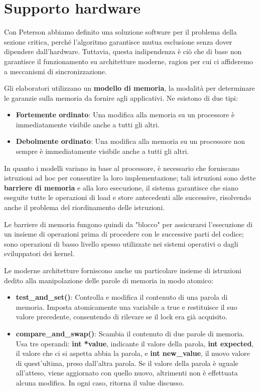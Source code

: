 \section{Supporto hardware}
Con Peterson abbiamo definito una soluzione software per il problema della sezione critica, perché l'algoritmo garantisce mutua esclusione senza dover
dipendere dall'hardware. Tuttavia, questa indipendenza è ciò che di base non garantisce il funzionamento su architetture moderne, ragion per cui ci
affideremo a meccanismi di sincronizzazione.\par
Gli elaboratori utilizzano un \textbf{modello di memoria}, la modalità per determinare le garanzie sulla memoria da fornire agli applicativi. Ne
esistono di due tipi: \begin{itemize}
    \item \textbf{Fortemente ordinato}: Una modifica alla memoria su un processore è immediatamente visibile anche a tutti gli altri.
    \item \textbf{Debolmente ordinato}: Una modifica alla memoria su un processore non sempre è immediatamente visibile anche a tutti gli altri.
\end{itemize}

\noindent In quanto i modelli variano in base al processore, è necessario che forniscano istruzioni ad hoc per consentire la loro implementazione; tali
istruzioni sono dette \textbf{barriere di memoria} e alla loro esecuzione, il sistema garantisce che siano eseguite tutte le operazioni di load e
store antecedenti alle successive, risolvendo anche il problema del riordinamento delle istruzioni.\par
Le barriere di memoria fungono quindi da "blocco" per assicurarsi l'esecuzione di un insieme di operazioni prima di procedere con le successive parti
del codice; sono operazioni di basso livello spesso utilizzate nei sistemi operativi o dagli sviluppatori dei kernel.\par
Le moderne architetture forniscono anche un particolare insieme di istruzioni dedito alla manipolazione delle parole di memoria in modo
atomico: \begin{itemize}
    \item \textbf{test\_and\_set()}: Controlla e modifica il contenuto di una parola di memoria. Imposta atomicamente una variabile a true e
    restituisce il suo valore precedente, consentendo di rilevare se il lock era già acquisito.
    \item \textbf{compare\_and\_swap()}: Scambia il contenuto di due parole di memoria. Usa tre operandi: \textbf{int *value}, indicante il valore
    della parola, \textbf{int expected}, il valore che ci si aspetta abbia la parola, e \textbf{int new\_value}, il nuovo valore di quest'ultima, preso
    dall'altra parola. Se il valore della parola è uguale all'atteso, viene aggiornato con quello nuovo, altrimenti non è effettuata alcuna modifica.
    In ogni caso, ritorna il value discusso.
\end{itemize}

